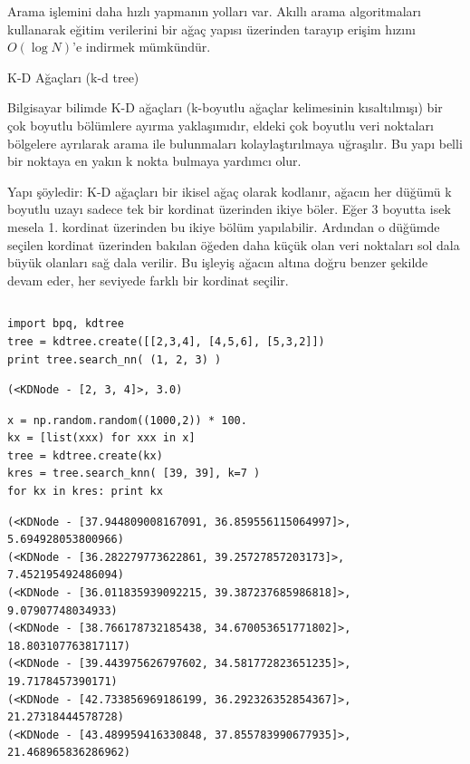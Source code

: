 \documentclass[12pt,fleqn]{article}\usepackage{../../common}
\begin{document}
Arama işlemini daha hızlı yapmanın yolları var. Akıllı arama algoritmaları
kullanarak eğitim verilerini bir ağaç yapısı üzerinden tarayıp erişim
hızını $O(\log N)$'e indirmek mümkündür.

K-D Ağaçları (k-d tree)

Bilgisayar bilimde K-D ağaçları (k-boyutlu ağaçlar kelimesinin
kısaltılmışı) bir çok boyutlu bölümlere ayırma yaklaşımıdır, eldeki çok
boyutlu veri noktaları bölgelere ayrılarak arama ile bulunmaları
kolaylaştırılmaya uğraşılır. Bu yapı belli bir noktaya en yakın k nokta
bulmaya yardımcı olur.

Yapı şöyledir: K-D ağaçları bir ikisel ağaç olarak kodlanır, ağacın her
düğümü k boyutlu uzayı sadece tek bir kordinat üzerinden ikiye böler. Eğer
3 boyutta isek mesela 1. kordinat üzerinden bu ikiye bölüm
yapılabilir. Ardından o düğümde seçilen kordinat üzerinden bakılan öğeden
daha küçük olan veri noktaları sol dala büyük olanları sağ dala verilir. Bu
işleyiş ağacın altına doğru benzer şekilde devam eder, her seviyede farklı
bir kordinat seçilir.

\inputminted[fontsize=\footnotesize]{python}{kdtree.py}

\begin{verbatim}
import bpq, kdtree
tree = kdtree.create([[2,3,4], [4,5,6], [5,3,2]])
print tree.search_nn( (1, 2, 3) )
\end{verbatim}

\begin{verbatim}
(<KDNode - [2, 3, 4]>, 3.0)
\end{verbatim}

\begin{verbatim}
x = np.random.random((1000,2)) * 100.
kx = [list(xxx) for xxx in x]
tree = kdtree.create(kx)
kres = tree.search_knn( [39, 39], k=7 )
for kx in kres: print kx
\end{verbatim}

\begin{verbatim}
(<KDNode - [37.944809008167091, 36.859556115064997]>, 5.694928053800966)
(<KDNode - [36.282279773622861, 39.25727857203173]>, 7.452195492486094)
(<KDNode - [36.011835939092215, 39.387237685986818]>, 9.07907748034933)
(<KDNode - [38.766178732185438, 34.670053651771802]>, 18.803107763817117)
(<KDNode - [39.443975626797602, 34.581772823651235]>, 19.7178457390171)
(<KDNode - [42.733856969186199, 36.292326352854367]>, 21.27318444578728)
(<KDNode - [43.489959416330848, 37.855783990677935]>, 21.468965836286962)
\end{verbatim}
\end{document}
